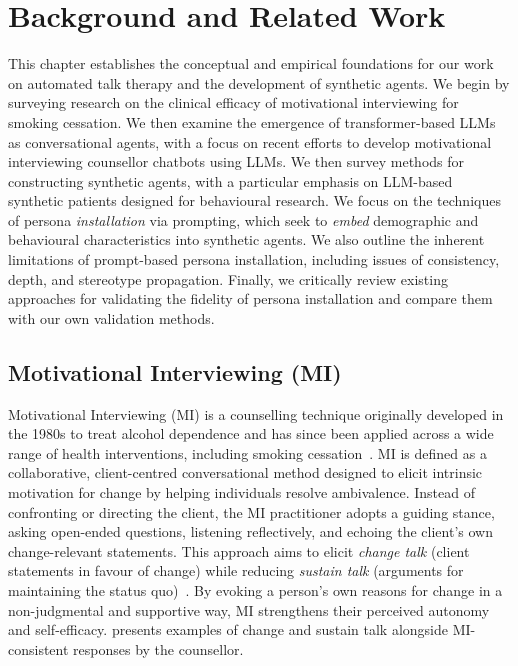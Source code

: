 \chapter{Background and Related Work}
\label{ch:background}
This chapter establishes the conceptual and empirical foundations for our work on automated talk therapy and the development of synthetic agents. We begin by surveying research on the clinical efficacy of motivational interviewing for smoking cessation. We then examine the emergence of transformer-based LLMs as conversational agents, with a focus on recent efforts to develop motivational interviewing counsellor chatbots using LLMs. We then survey methods for constructing synthetic agents, with a particular emphasis on LLM-based synthetic patients designed for behavioural research. We focus on the techniques of persona \emph{installation} via prompting, which seek to \emph{embed} demographic and behavioural characteristics into synthetic agents. We also outline the inherent limitations of prompt-based persona installation, including issues of consistency, depth, and stereotype propagation. Finally, we critically review existing approaches for validating the fidelity of persona installation and compare them with our own validation methods.


\section{Motivational Interviewing (MI)}
Motivational Interviewing (MI) is a counselling technique originally developed in the 1980s to treat alcohol dependence and has since been applied across a wide range of health interventions, including smoking cessation~\cite{Miller_1983, MillerRollnick2023}. MI is defined as a collaborative, client-centred conversational method designed to elicit intrinsic motivation for change by helping individuals resolve ambivalence. Instead of confronting or directing the client, the MI practitioner adopts a guiding stance, asking open-ended questions, listening reflectively, and echoing the client's own change-relevant statements. This approach aims to elicit \emph{change talk} (client statements in favour of change) while reducing \emph{sustain talk} (arguments for maintaining the status quo)~\cite{MillerRose2009}. By evoking a person's own reasons for change in a non-judgmental and supportive way, MI strengthens their perceived autonomy and self-efficacy.  presents examples of change and sustain talk alongside MI-consistent responses by the counsellor.



